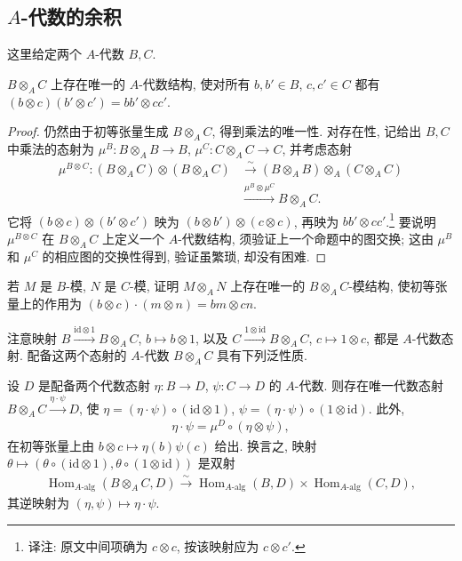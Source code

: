 \subsection{$A$-代数的余积}\label{sec:galois-1-8-11}
这里给定两个 $A$-代数 $B,C$.
\begin{proposition*}
$B\otimes_A C$ 上存在唯一的 $A$-代数结构, 使对所有 $b,b'\in B$, $c,c'\in C$ 都有 $(b\otimes c)(b'\otimes c')=bb'\otimes cc'$.
\end{proposition*}
\begin{proof}
仍然由于初等张量生成 $B\otimes_A C$, 得到乘法的唯一性. 对存在性, 记给出 $B,C$ 中乘法的态射为 $\mu^B:B\otimes_A B\longrightarrow B$, $\mu^C:C\otimes_A C\longrightarrow C$, 并考虑态射
\begin{align*}
\mu^{B\otimes C}:(B\otimes_A C)\otimes(B\otimes_A C)
&\xrightarrow{\sim}(B\otimes_A B)\otimes_A(C\otimes_A C)\\
&\xrightarrow{\mu^B\otimes\mu^C}B\otimes_A C.
\end{align*}
它将 $(b\otimes c)\otimes(b'\otimes c')$ 映为 $(b\otimes b')\otimes(c\otimes c)$, 再映为 $bb'\otimes cc'$.\footnote{译注: 原文中间项确为 $c\otimes c$, 按该映射应为 $c\otimes c'$.} 要说明 $\mu^{B\otimes C}$ 在 $B\otimes_A C$ 上定义一个 $A$-代数结构, 须验证上一个命题中的图交换; 这由 $\mu^B$ 和 $\mu^C$ 的相应图的交换性得到, 验证虽繁琐, 却没有困难.
\end{proof}
\begin{exercise*}
若 $M$ 是 $B$-模, $N$ 是 $C$-模, 证明 $M\otimes_A N$ 上存在唯一的 $B\otimes_A C$-模结构, 使初等张量上的作用为 $(b\otimes c)\cdot(m\otimes n)=bm\otimes cn$.
\end{exercise*}
注意映射 $B\xrightarrow{\mathrm{id}\otimes1}B\otimes_A C$, $b\mapsto b\otimes1$, 以及 $C\xrightarrow{1\otimes\mathrm{id}}B\otimes_A C$, $c\mapsto1\otimes c$, 都是 $A$-代数态射. 配备这两个态射的 $A$-代数 $B\otimes_A C$ 具有下列泛性质.
\begin{proposition*}
设 $D$ 是配备两个代数态射 $\eta:B\longrightarrow D$, $\psi:C\longrightarrow D$ 的 $A$-代数. 则存在唯一代数态射 $B\otimes_A C\xrightarrow{\eta\cdot\psi}D$, 使 $\eta=(\eta\cdot\psi)\circ(\mathrm{id}\otimes1)$, $\psi=(\eta\cdot\psi)\circ(1\otimes\mathrm{id})$. 此外,
\begin{align*}
\eta\cdot\psi=\mu^D\circ(\eta\otimes\psi),
\end{align*}
在初等张量上由 $b\otimes c\mapsto\eta(b)\psi(c)$ 给出. 换言之, 映射 $\theta\mapsto(\theta\circ(\mathrm{id}\otimes1),\theta\circ(1\otimes\mathrm{id}))$ 是双射
\begin{align*}
\operatorname{Hom}_{A\text{-}\mathrm{alg}}(B\otimes_A C,D)\xrightarrow{\sim}
\operatorname{Hom}_{A\text{-}\mathrm{alg}}(B,D)\times\operatorname{Hom}_{A\text{-}\mathrm{alg}}(C,D),
\end{align*}
其逆映射为 $(\eta,\psi)\mapsto\eta\cdot\psi$.
\end{proposition*}
